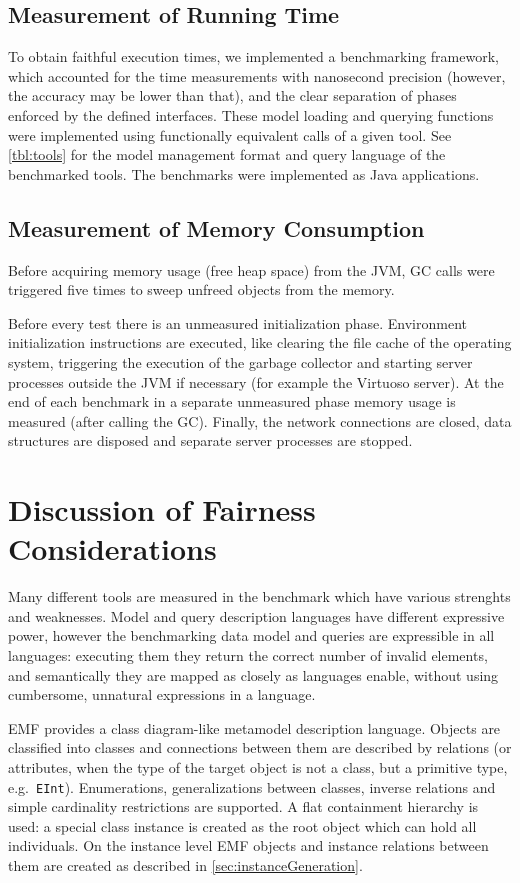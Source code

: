 \subsection{Measurement of Running Time}

To obtain faithful execution times, we implemented a benchmarking framework,
which accounted for the time measurements with nanosecond precision (however, the accuracy may be lower than that),
 and the clear separation of phases enforced by the defined
interfaces. These model loading and querying functions were implemented using
functionally equivalent calls of a given tool. See \autoref{tbl:tools} for
the model management format and query language of the benchmarked tools. The
benchmarks were implemented as Java applications.

\subsection{Measurement of Memory Consumption}
Before acquiring memory usage (free heap space) from the JVM, GC calls were triggered five times to sweep unfreed objects from the memory.

Before every test
there is an unmeasured initialization phase. Environment initialization
instructions are executed, like clearing the file cache of the operating system, triggering the
execution of the garbage collector and starting server processes outside the
JVM if necessary (for example the Virtuoso server). At the end of each benchmark
in a separate unmeasured phase memory usage is measured (after calling the GC).
Finally, the network connections are closed, data structures are disposed and
separate server processes are stopped.


\section{Discussion of Fairness Considerations}
Many different tools are measured in the benchmark which have various strenghts
and weaknesses. Model and query description languages have different expressive
power, however the benchmarking data model and queries are expressible in all
languages: executing them they return the correct number of invalid elements,
and semantically they are mapped as closely as languages enable, without using
cumbersome, unnatural expressions in a language.

EMF provides a class diagram-like metamodel description language. Objects are
classified into classes and connections between them are described by relations
(or attributes, when the type of the target object is not a class, but a primitive
type, e.g.\ \texttt{EInt}). Enumerations, generalizations between classes, inverse
relations and simple cardinality restrictions are supported. A flat containment
hierarchy is used: a special class instance is created as the root object which can
hold all individuals. On the instance level EMF objects and instance relations between them 
are created as described in \autoref{sec:instanceGeneration}.

